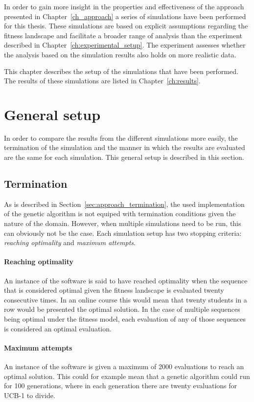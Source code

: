 In order to gain more insight in the properties and effectiveness of
the approach presented in Chapter~\ref{ch_approach} a series of
simulations have been performed for this thesis. These simulations are
based on explicit assumptions regarding the fitness landscape and
facilitate a broader range of analysis than the experiment described in
Chapter~\ref{ch:experimental_setup}. The experiment assesses whether the
analysis based on the simulation results also holds on more realistic data.

This chapter describes the setup of the simulations that have been performed.
The results of these simulations are listed in Chapter~\ref{ch:results}.

\section{General setup}
In order to compare the results from the different simulations more easily, the
termination of the simulation and the manner in which the results are evaluated
are the same for each simulation. This general setup is described in this
section.
\subsection{Termination}
\label{sec:simulations_termination}
As is described in Section~\ref{sec:approach_termination}, the used
implementation of the genetic algorithm is not equiped with termination
conditions given the nature of the domain. However, when multiple simulations
need to be run, this can obviously not be the case. Each simulation setup has
two stopping criteria: \emph{reaching optimality} and \emph{maximum attempts}.
\paragraph{Reaching optimality} An instance of the software is said to have
reached optimality when the sequence that is considered optimal given the
fitness landscape is evaluated twenty consecutive times. In an online course
this would mean that twenty students in a row would be presented the optimal
solution. In the case of multiple sequences being optimal under the fitness
model, each evaluation of any of those sequences is considered an optimal
evaluation.
\paragraph{Maximum attempts} An instance of the software is given a maximum of
2000 evaluations to reach an optimal solution. This could for example mean that
a genetic algorithm could run for 100 generations, where in each generation
there are twenty evaluations for UCB-1 to divide.

